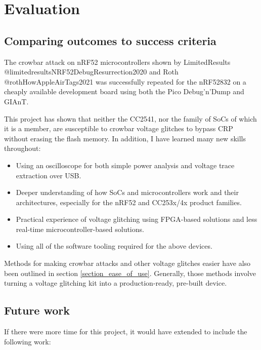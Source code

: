 \hypertarget{evaluation}{%
\section{Evaluation}\label{evaluation}}

\hypertarget{comparing-outcomes-to-success-criteria}{%
\subsection{Comparing outcomes to success
criteria}\label{comparing-outcomes-to-success-criteria}}

The crowbar attack on nRF52 microcontrollers shown by LimitedResults
@limitedresultsNRF52DebugResurrection2020 and Roth
@rothHowAppleAirTags2021 was successfully repeated for the nRF52832 on a
cheaply available development board using both the Pico Debug'n'Dump and
GIAnT.

This project has shown that neither the CC2541, nor the family of SoCs
of which it is a member, are susceptible to crowbar voltage glitches to
bypass CRP without erasing the flash memory. In addition, I have learned
many new skills throughout:

\begin{itemize}
\tightlist
\item
  Using an oscilloscope for both simple power analysis and voltage trace
  extraction over USB.
\item
  Deeper understanding of how SoCs and microcontrollers work and their
  architectures, especially for the nRF52 and CC253x/4x product
  families.
\item
  Practical experience of voltage glitching using FPGA-based solutions
  and less real-time microcontroller-based solutions.
\item
  Using all of the software tooling required for the above devices.
\end{itemize}

Methods for making crowbar attacks and other voltage glitches easier
have also been outlined in section \ref{section_ease_of_use}. Generally,
those methods involve turning a voltage glitching kit into a
production-ready, pre-built device.

\hypertarget{future-work}{%
\subsection{Future work}\label{future-work}}

If there were more time for this project, it would have extended to
include the following work:


